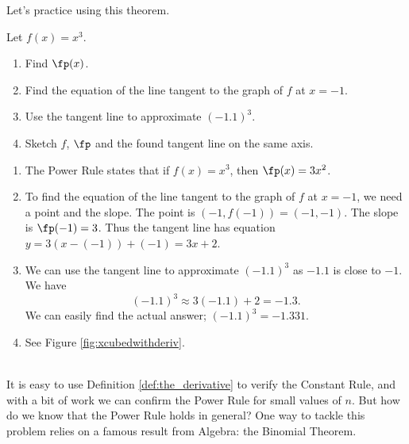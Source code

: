 \enlargethispage{1\baselineskip}
Let's practice using this theorem.\\

{Let $f(x)=x^3$. 

		\begin{enumerate}
		\item		Find $\fp(x)$.
		\item		Find the equation of the line tangent to the graph of $f$ at $x=-1$. 
		\item		Use the tangent line to approximate $(-1.1)^3$.
		\item		Sketch $f$, $\fp$ and the found tangent line on the same axis.
		\end{enumerate}
}
{	\begin{enumerate}
\enlargethispage{\baselineskip}
		\item		The Power Rule states that if $f(x) = x^3$, then $\fp(x) = 3x^2$. 

		\item		To find the equation of the line tangent to the graph of $f$ at $x=-1$, we need a point and the slope. The point is $(-1,f(-1)) = (-1, -1)$. The slope is $\fp(-1)= 3$. Thus the tangent line has equation $y = 3(x-(-1))+(-1) = 3x+2$. 
		
		\item		We can use the tangent line to approximate $(-1.1)^3$ as $-1.1$ is close to $-1$. We have 
		\[
		(-1.1)^3 \approx 3(-1.1)+2 = -1.3.
		\]
			We can easily find the actual answer; $(-1.1)^3 = -1.331$. 
		
		\item		See Figure \ref{fig:xcubedwithderiv}.
		\end{enumerate}
\baselineskip
}\\

It is easy to use Definition \ref{def:the_derivative} to verify the Constant Rule, and with a bit of work we can confirm the Power Rule for small values of $n$. But how do we know that the Power Rule holds in general? One way to tackle this problem relies on a famous result from Algebra: the Binomial Theorem.

